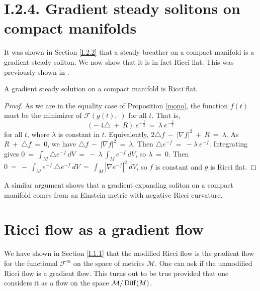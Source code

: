 \section{I.2.4. Gradient steady solitons on compact manifolds}

It was shown in Section \ref{I.2.2} that a steady breather on a compact manifold
is a gradient steady soliton.  We now show that it is in fact Ricci flat.
This was previously shown in \cite[Theorem 20.1]{Hamilton}.

\begin{proposition}
  \label{prop:kl-gradient-steady-solitons-compact-manifolds-compactness-ricci-solitons}

A gradient steady solution on a compact manifold is Ricci flat.
\end{proposition}
\begin{proof}
As we are in the equality case of Proposition \ref{mono},
the function $f(t)$ must be the minimizer of ${\mathcal F}(g(t), \cdot)$
for all $t$. That is,
\begin{equation}
(- \: 4 \triangle \: + \: R) \: e^{-\frac{f}{2}} \: = \: \lambda \:
e^{-\frac{f}{2}}
\end{equation}
for all $t$, where $\lambda$ is constant in $t$.
Equivalently, $2 \triangle f \: - \: |\nabla f|^2 \: + \: R \: = \:
\lambda$. As $R \: + \: \triangle f \: = \: 0$, we have
$\triangle f \: - \: |\nabla f|^2 \: = \: \lambda$. Then
$\triangle e^{-f} \: = \: - \lambda \: e^{-f}$. Integrating gives
$0 \: = \: \int_M \triangle e^{-f} \: dV \: = \: - \: \lambda \:
\int_M e^{-f} \: dV$, so $\lambda \: = \: 0$. Then
$0 \: = \: - \: \int_M e^{-f} \: \triangle e^{-f} \: dV \: = \:
\int_M \left| \nabla e^{-f} \right|^2 \: dV$,
so $f$ is constant and $g$ is Ricci flat.
\end{proof}

A similar argument shows that a gradient expanding soliton on a
compact manifold comes from an Einstein metric with negative
Ricci curvature.

\section{Ricci flow as a gradient flow}

We have shown in Section \ref{I.1.1} that the modified Ricci flow is the gradient flow
for the functional ${\mathcal F}^m$ on the space of metrics ${\mathcal M}$.
One can ask if the unmodified Ricci flow is a gradient flow. This turns out to be true
provided that one
considers it as a flow on the space ${\mathcal M}/\operatorname{Diff}(M)$.

